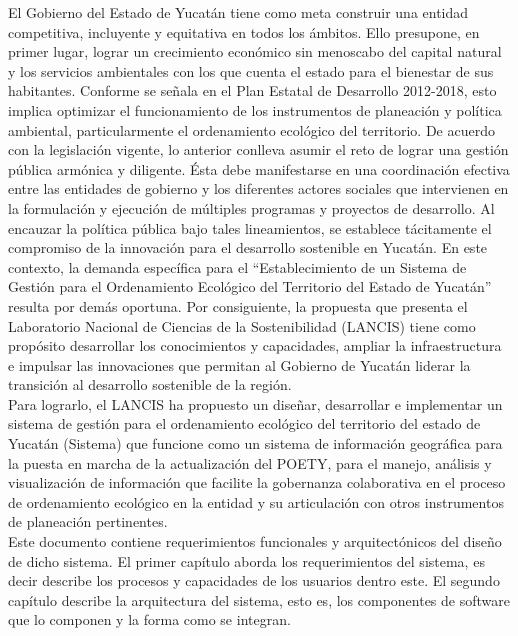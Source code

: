 
El Gobierno del Estado de Yucatán tiene como meta construir una entidad competitiva, incluyente
y equitativa en todos los ámbitos. Ello presupone, en primer lugar, lograr un crecimiento
económico sin menoscabo del capital natural y los servicios ambientales con los que cuenta el
estado para el bienestar de sus habitantes. Conforme se señala en el Plan Estatal de Desarrollo
2012-2018, esto implica optimizar el funcionamiento de los instrumentos de planeación y política
ambiental, particularmente el ordenamiento ecológico del territorio. De acuerdo con la legislación
vigente, lo anterior conlleva asumir el reto de lograr una gestión pública armónica y diligente. Ésta
debe manifestarse en una coordinación efectiva entre las entidades de gobierno y los diferentes
actores sociales que intervienen en la formulación y ejecución de múltiples programas y proyectos
de desarrollo. Al encauzar la política pública bajo tales lineamientos, se establece tácitamente el
compromiso de la innovación para el desarrollo sostenible en Yucatán.  En este contexto, la
demanda específica para el “Establecimiento de un Sistema de Gestión para el Ordenamiento
Ecológico del Territorio del Estado de Yucatán” resulta por demás oportuna. Por consiguiente, la
propuesta que presenta el Laboratorio Nacional de Ciencias de la Sostenibilidad (LANCIS) tiene
como propósito desarrollar los conocimientos y capacidades, ampliar la infraestructura e impulsar
las innovaciones que permitan al Gobierno de Yucatán liderar la transición al desarrollo sostenible
de la región. \\

Para lograrlo, el LANCIS ha propuesto un diseñar, desarrollar e implementar un sistema de gestión para el ordenamiento ecológico del
territorio del estado de Yucatán (Sistema) que funcione como un sistema de información
geográfica para la puesta en marcha de la actualización del POETY, para el manejo, análisis y
visualización de información que facilite la gobernanza colaborativa en el proceso de
ordenamiento ecológico en la entidad y su articulación con otros instrumentos de planeación
pertinentes.\\

Este documento contiene requerimientos funcionales y arquitectónicos del diseño de dicho sistema. El primer capítulo aborda los requerimientos del sistema, es decir describe los procesos
y capacidades de los usuarios dentro este. El segundo capítulo describe la arquitectura del sistema, esto es, los componentes de software que lo componen y la forma como se integran.\\